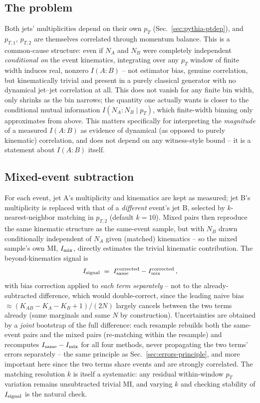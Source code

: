 \documentclass[11pt]{article}
\begin{document}
\subsection{The problem}

Both jets' multiplicities depend on their own $p_T$
(Sec.~\ref{sec:pythia-ptdep}), and $p_{T,1}$, $p_{T,2}$ are themselves
correlated through momentum balance. This is a common-cause structure:
even if $N_A$ and $N_B$ were completely independent \emph{conditional
on} the event kinematics, integrating over any $p_T$ window of finite
width induces real, nonzero $I(A{:}B)$ -- not estimator bias, genuine
correlation, but kinematically trivial and present in a purely classical
generator with no dynamical jet--jet correlation at all. This does not
vanish for any finite bin width, only shrinks as the bin narrows; the
quantity one actually wants is closer to the conditional mutual
information $I(N_A{:}N_B \mid p_T)$, which finite-width binning only
approximates from above. This matters specifically for interpreting the
\emph{magnitude} of a measured $I(A{:}B)$ as evidence of dynamical (as
opposed to purely kinematic) correlation, and does not depend on any
witness-style bound -- it is a statement about $I(A{:}B)$ itself.

\subsection{Mixed-event subtraction}

For each event, jet A's multiplicity and kinematics are kept as
measured; jet B's multiplicity is replaced with that of a
\emph{different} event's jet B, selected by $k$-nearest-neighbor
matching in $p_{T,2}$ (default $k=10$). Mixed pairs then reproduce the
same kinematic structure as the same-event sample, but with $N_B$ drawn
conditionally independent of $N_A$ given (matched) kinematics -- so the
mixed sample's own MI, $I_{\rm mix}$, directly estimates the trivial
kinematic contribution. The beyond-kinematics signal is
\begin{equation}
I_{\rm signal} \;=\; I^{\rm corrected}_{\rm same} - I^{\rm corrected}_{\rm mix}\,,
\end{equation}
with bias correction applied to \emph{each term separately} -- not to
the already-subtracted difference, which would double-correct, since
the leading naive bias $\approx(K_{AB}-K_A-K_B+1)/(2N)$ largely cancels
between the two terms already (same marginals and same $N$ by
construction). Uncertainties are obtained by a \emph{joint} bootstrap of
the full difference: each resample rebuilds both the same-event pairs
and the mixed pairs (re-matching within the resample) and recomputes
$I_{\rm same}-I_{\rm mix}$ for all four methods, never propagating the
two terms' errors separately -- the same principle as
Sec.~\ref{sec:errors-principle}, and more important here since the two
terms share events and are strongly correlated. The matching resolution
$k$ is itself a systematic: any residual within-window $p_T$ variation
remains unsubtracted trivial MI, and varying $k$ and checking stability
of $I_{\rm signal}$ is the natural check.
\end{document}
